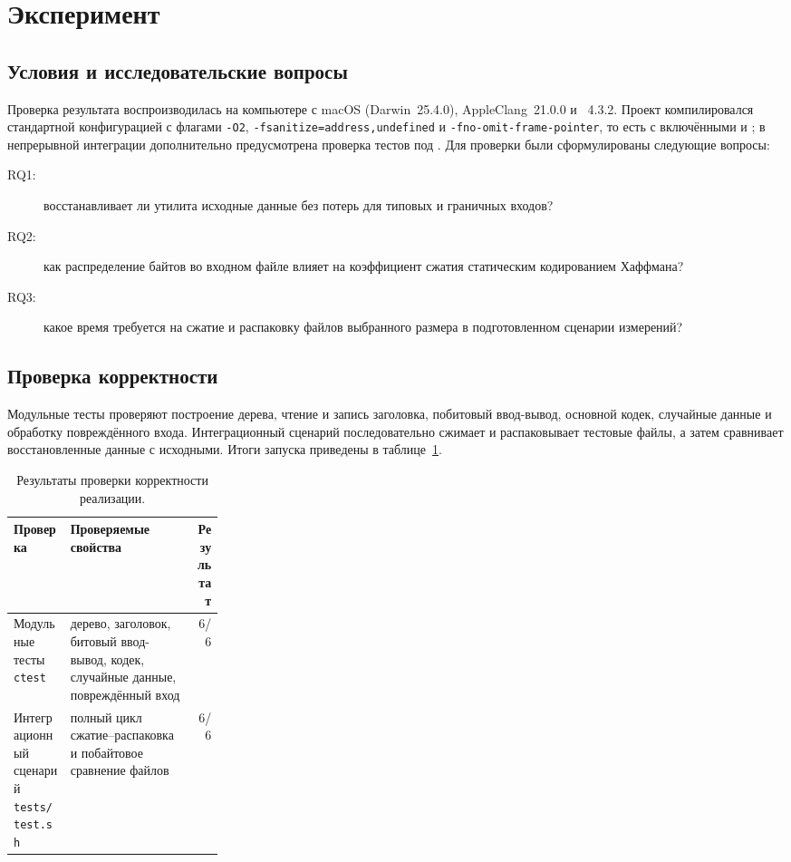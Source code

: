 
\section{Эксперимент}
\label{sec:experiment}

\subsection{Условия и исследовательские вопросы}

Проверка результата воспроизводилась  на компьютере с
macOS (Darwin~25.4.0), AppleClang~21.0.0 и \CMake{}~4.3.2. Проект
компилировался стандартной конфигурацией \CMake{} с флагами
\texttt{-O2}, \texttt{-fsanitize=address,undefined} и
\texttt{-fno-omit-frame-pointer}, то есть с включёнными \AddressSanitizer{} и
\UndefinedBehaviorSanitizer{}; в непрерывной интеграции дополнительно
предусмотрена проверка тестов под \Valgrind{}. Для проверки были сформулированы
следующие вопросы:
\begin{description}
    \item[RQ1:] восстанавливает ли утилита исходные данные без потерь для
          типовых и граничных входов?
    \item[RQ2:] как распределение байтов во входном файле влияет на
          коэффициент сжатия статическим кодированием Хаффмана?
    \item[RQ3:] какое время требуется на сжатие и распаковку файлов выбранного
          размера в подготовленном сценарии измерений?
\end{description}

\subsection{Проверка корректности}

Модульные тесты проверяют построение дерева, чтение и запись заголовка,
побитовый ввод-вывод, основной кодек, случайные данные и обработку повреждённого
входа. Интеграционный сценарий последовательно сжимает и распаковывает
тестовые файлы, а затем сравнивает восстановленные данные с исходными. Итоги
запуска приведены в таблице~\ref{tab:tests}.

\begin{table}[htbp]
    \centering
    \caption{Результаты проверки корректности реализации.}
    \label{tab:tests}
    \begin{tabularx}{\textwidth}{@{}>{\raggedright\arraybackslash}p{0.27\linewidth}>{\raggedright\arraybackslash}X r@{}}
        \toprule
        Проверка & Проверяемые свойства & Результат \\
        \midrule
        Модульные тесты \texttt{ctest} &
        дерево, заголовок, битовый ввод-вывод, кодек, случайные данные,
        повреждённый вход & 6/6 \\
        Интеграционный сценарий \texttt{tests/test.sh} &
        полный цикл сжатие--распаковка и побайтовое сравнение файлов &
        6/6 \\
        \bottomrule
    \end{tabularx}
\end{table}

